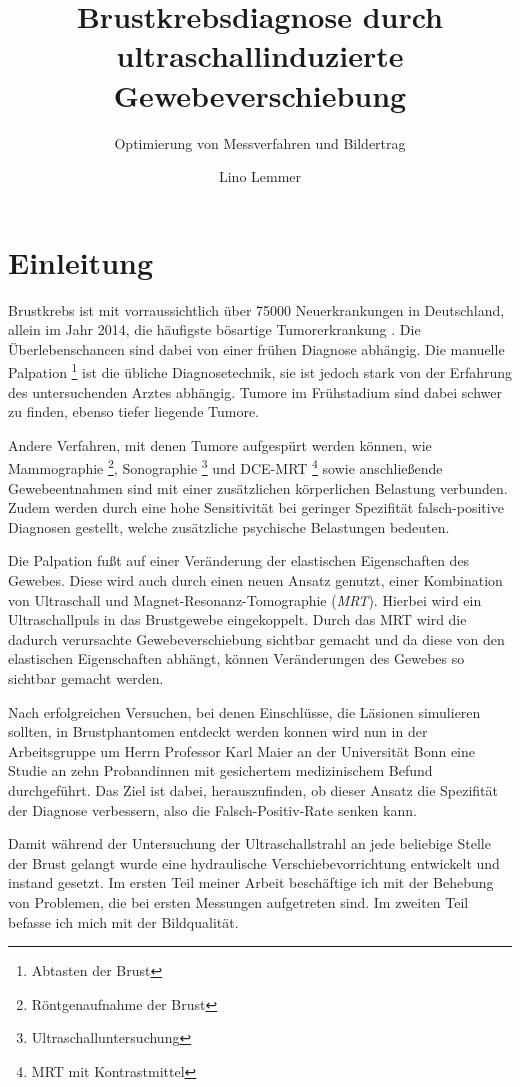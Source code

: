 \documentclass[
    11pt,
    ngerman
]{scrreprt}
\author{Lino Lemmer}
\title{Brustkrebsdiagnose durch ultraschallinduzierte Gewebeverschiebung}
\subtitle{Optimierung von Messverfahren und Bildertrag}
\begin{document}
\maketitle


\tableofcontents

\chapter{Einleitung}

Brustkrebs ist mit vorraussichtlich über 75000 Neuerkrankungen in Deutschland,
allein im Jahr 2014, die häufigste bösartige Tumorerkrankung
\parencite[68]{krebs_in_deutschland}. Die Überlebenschancen sind dabei von
einer frühen Diagnose abhängig. Die manuelle Palpation \footnote{Abtasten der
Brust} ist die übliche Diagnosetechnik, sie ist jedoch stark von der Erfahrung
des untersuchenden Arztes abhängig. Tumore im Frühstadium sind dabei schwer zu
finden, ebenso tiefer liegende Tumore.

Andere Verfahren, mit denen Tumore aufgespürt werden können, wie Mammographie
\footnote{Röntgenaufnahme der Brust}, Sonographie
\footnote{Ultraschalluntersuchung} und DCE-MRT \footnote{MRT mit
Kontrastmittel} sowie anschließende Gewebeentnahmen sind mit einer zusätzlichen
körperlichen Belastung verbunden. Zudem werden durch eine hohe Sensitivität bei
geringer Spezifität falsch-positive Diagnosen gestellt, welche zusätzliche
psychische Belastungen bedeuten.

Die Palpation fußt auf einer Veränderung der elastischen Eigenschaften des
Gewebes.
Diese wird auch durch einen neuen Ansatz genutzt, einer Kombination
von Ultraschall und Magnet-Resonanz-Tomographie (\emph{MRT}). Hierbei wird ein
Ultraschallpuls in das Brustgewebe eingekoppelt. Durch das MRT wird die dadurch
verursachte Gewebeverschiebung sichtbar gemacht und da diese von den
elastischen Eigenschaften abhängt, können Veränderungen des Gewebes so sichtbar
gemacht werden.

Nach erfolgreichen Versuchen, bei denen Einschlüsse, die Läsionen simulieren
sollten, in Brustphantomen entdeckt werden konnen \parencite{dipl_ulucay} wird
nun in der Arbeitsgruppe um Herrn Professor Karl Maier an der Universität Bonn
eine Studie an zehn Probandinnen mit gesichertem medizinischem Befund
durchgeführt. Das Ziel ist dabei, herauszufinden, ob dieser Ansatz die
Spezifität der Diagnose verbessern, also die Falsch-Positiv-Rate senken kann.

Damit während der Untersuchung der Ultraschallstrahl an jede beliebige Stelle
der Brust gelangt wurde eine hydraulische Verschiebevorrichtung entwickelt und
instand gesetzt. Im ersten Teil meiner Arbeit beschäftige ich mit der Behebung
von Problemen, die bei ersten Messungen aufgetreten sind. Im zweiten Teil
befasse ich mich mit der Bildqualität.
\end{document}
